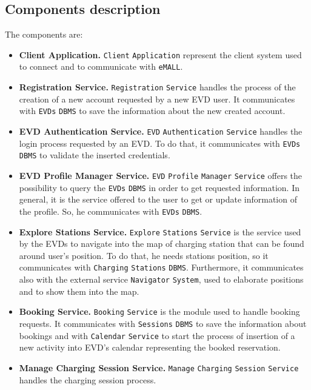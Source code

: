 \subsection{Components description}
\label{subsec:components_description}%
The components are:
\begin{itemize}
    \item \textbf{Client Application.} \verb|Client| \verb|Application| represent the client system used to connect and to communicate
    with \verb|eMALL|.
    \item \textbf{Registration Service.} \verb|Registration| \verb|Service| handles the process of the creation
    of a new account requested by a new EVD user.
    It communicates with \verb|EVDs| \verb|DBMS| to save the information about the new created account.
    \item \textbf{EVD Authentication Service.} \verb|EVD| \verb|Authentication| \verb|Service| handles the login process requested by an EVD\@.
    To do that, it communicates with \verb|EVDs| \verb|DBMS| to validate the inserted credentials.
    \item \textbf{EVD Profile Manager Service.} \verb|EVD| \verb|Profile| \verb|Manager| \verb|Service| offers the possibility to query
    the \verb|EVDs| \verb|DBMS| in order to get requested information.
    In general, it is the service offered to the user to get or update information of the profile.
    So, he communicates with \verb|EVDs| \verb|DBMS|.
    \item \textbf{Explore Stations Service.} \verb|Explore| \verb|Stations| \verb|Service| is the service used by the EVDs to navigate
    into the map of charging station that can be found around user's position.
    To do that, he needs stations position, so it communicates with \verb|Charging| \verb|Stations| \verb|DBMS|.
    Furthermore, it communicates also with the external service \verb|Navigator| \verb|System|, used to elaborate positions
    and to show them into the map.
    \item \textbf{Booking Service.} \verb|Booking| \verb|Service| is the module used to handle booking requests.
    It communicates with \verb|Sessions| \verb|DBMS| to save the information about bookings and with \verb|Calendar| \verb|Service|
    to start the process of insertion of a new activity into EVD's calendar representing the booked reservation.
    \item \textbf{Manage Charging Session Service.} \verb|Manage| \verb|Charging| \verb|Session| \verb|Service| handles the charging session process.

\end{itemize}
